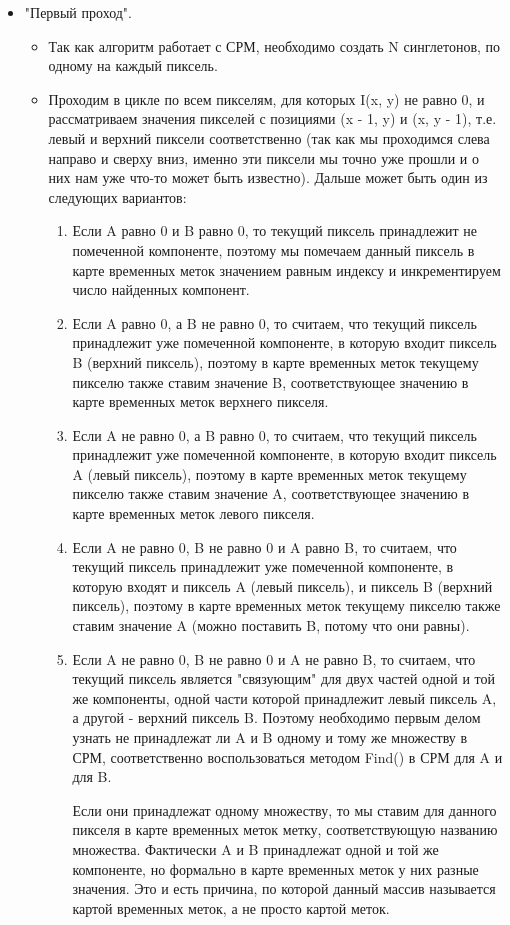 \documentclass{report}
\begin{document}
		\begin{itemize}
			\item "Первый проход"{}.
			\begin{itemize}
				\item Так как алгоритм работает с СРМ, необходимо создать N синглетонов, по одному на каждый пиксель.
				\item Проходим в цикле по всем пикселям, для которых I(x, y) не равно 0, и рассматриваем значения пикселей с позициями (x - 1, y) и (x, y - 1), т.е. левый и верхний пиксели соответственно (так как мы проходимся слева направо и сверху вниз, именно эти пиксели мы точно уже прошли и о них нам уже что-то может быть известно). Дальше может быть один из следующих вариантов:
				\begin{enumerate}
					\item Если A равно 0 и B равно 0, то текущий пиксель принадлежит не помеченной компоненте, поэтому мы помечаем данный пиксель в карте временных меток значением равным индексу и инкрементируем число найденных компонент.
					\item Если A равно 0, а B не равно 0, то считаем, что текущий пиксель принадлежит уже помеченной компоненте, в которую входит пиксель B (верхний пиксель), поэтому в карте временных меток текущему пикселю также ставим значение B, соответствующее значению в карте временных меток верхнего пикселя.
					\item Если A не равно 0, а B равно 0, то считаем, что текущий пиксель принадлежит уже помеченной компоненте, в которую входит пиксель A (левый пиксель), поэтому в карте временных меток текущему пикселю также ставим значение A, соответствующее значению в карте временных меток левого пикселя.
					\item Если A не равно 0, B не равно 0 и A равно B, то считаем, что текущий пиксель принадлежит уже помеченной компоненте, в которую входят и пиксель A (левый пиксель), и пиксель B (верхний пиксель), поэтому в карте временных меток текущему пикселю также ставим значение A (можно поставить B, потому что они равны).
					\item Если A не равно 0, B не равно 0 и A не равно B, то считаем, что текущий пиксель является "связующим"{} для двух частей одной и той же компоненты, одной части которой принадлежит левый пиксель A, а другой - верхний пиксель B. Поэтому необходимо первым делом узнать не принадлежат ли A и B одному и тому же множеству в СРМ, соответственно воспользоваться методом Find() в СРМ для A и для B. 
					\par Если они принадлежат одному множеству, то мы ставим для данного пикселя в карте временных меток метку, соответствующую названию множества. Фактически A и B принадлежат одной и той же компоненте, но формально в карте временных меток у них разные значения. Это и есть причина, по которой данный массив называется картой временных меток, а не просто картой меток.

\end{enumerate}
\end{itemize}
\end{itemize}
\end{document}
